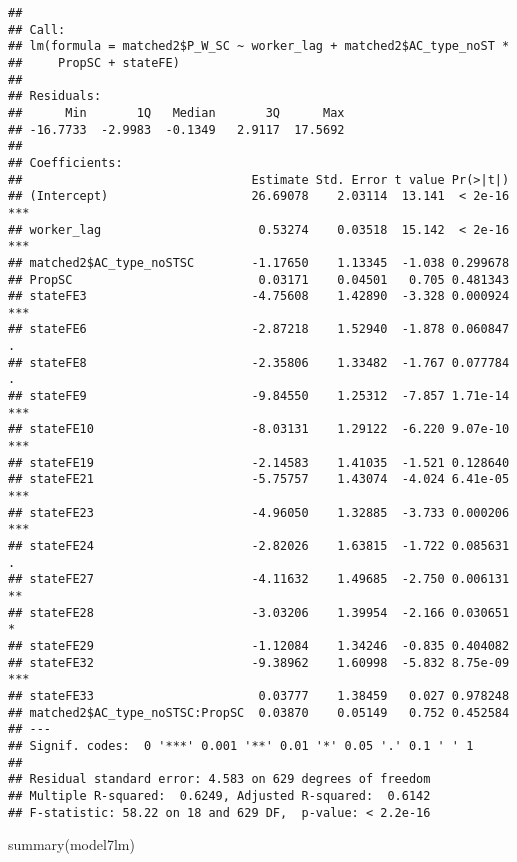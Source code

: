 \documentclass[
]{article}
\newenvironment{Shaded}{\begin{snugshade}}{\end{snugshade}}
\newcommand{\FunctionTok}[1]{\textcolor[rgb]{0.00,0.00,0.00}{#1}}
\newcommand{\NormalTok}[1]{#1}
\begin{document}
\begin{verbatim}
## 
## Call:
## lm(formula = matched2$P_W_SC ~ worker_lag + matched2$AC_type_noST * 
##     PropSC + stateFE)
## 
## Residuals:
##      Min       1Q   Median       3Q      Max 
## -16.7733  -2.9983  -0.1349   2.9117  17.5692 
## 
## Coefficients:
##                                Estimate Std. Error t value Pr(>|t|)    
## (Intercept)                    26.69078    2.03114  13.141  < 2e-16 ***
## worker_lag                      0.53274    0.03518  15.142  < 2e-16 ***
## matched2$AC_type_noSTSC        -1.17650    1.13345  -1.038 0.299678    
## PropSC                          0.03171    0.04501   0.705 0.481343    
## stateFE3                       -4.75608    1.42890  -3.328 0.000924 ***
## stateFE6                       -2.87218    1.52940  -1.878 0.060847 .  
## stateFE8                       -2.35806    1.33482  -1.767 0.077784 .  
## stateFE9                       -9.84550    1.25312  -7.857 1.71e-14 ***
## stateFE10                      -8.03131    1.29122  -6.220 9.07e-10 ***
## stateFE19                      -2.14583    1.41035  -1.521 0.128640    
## stateFE21                      -5.75757    1.43074  -4.024 6.41e-05 ***
## stateFE23                      -4.96050    1.32885  -3.733 0.000206 ***
## stateFE24                      -2.82026    1.63815  -1.722 0.085631 .  
## stateFE27                      -4.11632    1.49685  -2.750 0.006131 ** 
## stateFE28                      -3.03206    1.39954  -2.166 0.030651 *  
## stateFE29                      -1.12084    1.34246  -0.835 0.404082    
## stateFE32                      -9.38962    1.60998  -5.832 8.75e-09 ***
## stateFE33                       0.03777    1.38459   0.027 0.978248    
## matched2$AC_type_noSTSC:PropSC  0.03870    0.05149   0.752 0.452584    
## ---
## Signif. codes:  0 '***' 0.001 '**' 0.01 '*' 0.05 '.' 0.1 ' ' 1
## 
## Residual standard error: 4.583 on 629 degrees of freedom
## Multiple R-squared:  0.6249, Adjusted R-squared:  0.6142 
## F-statistic: 58.22 on 18 and 629 DF,  p-value: < 2.2e-16
\end{verbatim}

\begin{Shaded}
\begin{Highlighting}[]
\FunctionTok{summary}\NormalTok{(model7lm)}
\end{Highlighting}
\end{Shaded}
\end{document}
